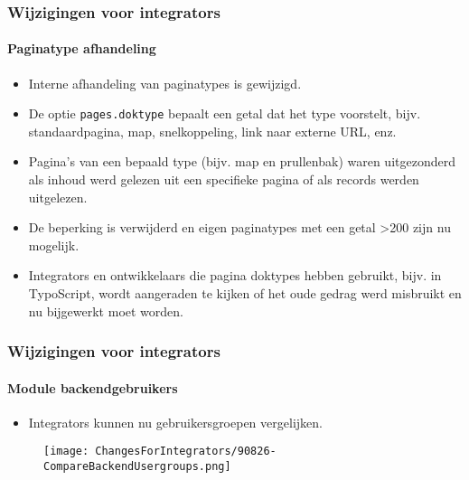 \begin{frame}[fragile]
	\frametitle{Wijzigingen voor integrators}
	\framesubtitle{Paginatype afhandeling}

	\begin{itemize}
		\item Interne afhandeling van paginatypes is gewijzigd.
		\item De optie \texttt{pages.doktype} bepaalt een getal dat het type voorstelt,
			bijv. standaardpagina, map, snelkoppeling, link naar externe URL, enz.
		\item Pagina's van een bepaald type (bijv. map en prullenbak) waren uitgezonderd als inhoud
			werd gelezen uit een specifieke pagina of als records werden uitgelezen.
		\item De beperking is verwijderd en eigen paginatypes met een getal >200 zijn nu mogelijk.
		\item Integrators en ontwikkelaars die pagina doktypes hebben gebruikt, bijv. in TypoScript,
			wordt aangeraden te kijken of het oude gedrag werd misbruikt en nu bijgewerkt moet worden.
	\end{itemize}

\end{frame}


\begin{frame}[fragile]
	\frametitle{Wijzigingen voor integrators}
	\framesubtitle{Module backendgebruikers}

	\begin{itemize}
		\item Integrators kunnen nu gebruikersgroepen vergelijken.
	\end{itemize}

	\begin{figure}
		\texttt{[image: ChangesForIntegrators/90826-CompareBackendUsergroups.png]}
	\end{figure}

\end{frame}


